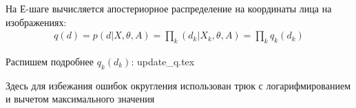 На Е-шаге вычисляется апостериорное распределение на координаты лица на изображениях:
\begin{gather*}
q(d) = p(d | X, \theta, A) = \prod_k (d_k | X_k, \theta, A) = \prod_k q_k(d_k)
\end{gather*}

Распишем подробнее $q_k(d_k)$:
{update_q.tex}

Здесь для избежания ошибок округления использован трюк с логарифмированием и вычетом максимального значения
